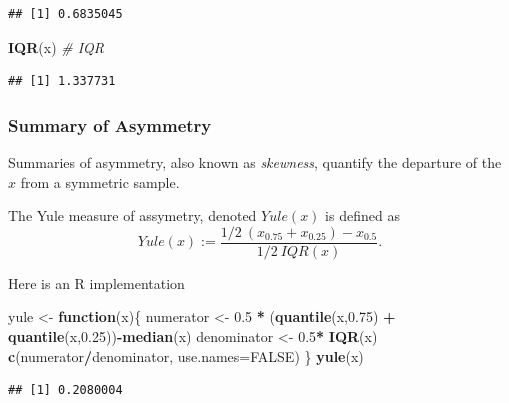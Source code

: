 \documentclass[]{book}
\newenvironment{Shaded}{\begin{snugshade}}{\end{snugshade}}
\newcommand{\CommentTok}[1]{\textcolor[rgb]{0.56,0.35,0.01}{\textit{#1}}}
\newcommand{\ControlFlowTok}[1]{\textcolor[rgb]{0.13,0.29,0.53}{\textbf{#1}}}
\newcommand{\DataTypeTok}[1]{\textcolor[rgb]{0.13,0.29,0.53}{#1}}
\newcommand{\FloatTok}[1]{\textcolor[rgb]{0.00,0.00,0.81}{#1}}
\newcommand{\KeywordTok}[1]{\textcolor[rgb]{0.13,0.29,0.53}{\textbf{#1}}}
\newcommand{\NormalTok}[1]{#1}
\newcommand{\OperatorTok}[1]{\textcolor[rgb]{0.81,0.36,0.00}{\textbf{#1}}}
\newcommand{\OtherTok}[1]{\textcolor[rgb]{0.56,0.35,0.01}{#1}}
\newcommand{\StringTok}[1]{\textcolor[rgb]{0.31,0.60,0.02}{#1}}
\theoremstyle{definition}
\theoremstyle{definition}
\theoremstyle{definition}
\theoremstyle{remark}
\let\BeginKnitrBlock\begin \let\EndKnitrBlock\end
\begin{document}
\begin{verbatim}
## [1] 0.6835045
\end{verbatim}

\begin{Shaded}
\begin{Highlighting}[]
\KeywordTok{IQR}\NormalTok{(x) }\CommentTok{# IQR}
\end{Highlighting}
\end{Shaded}

\begin{verbatim}
## [1] 1.337731
\end{verbatim}

\hypertarget{summary-of-asymmetry}{%
\subsubsection{Summary of Asymmetry}\label{summary-of-asymmetry}}

Summaries of asymmetry, also known as \emph{skewness}, quantify the departure of the \(x\) from a symmetric sample.

\BeginKnitrBlock{definition}[Yule]
\protect\hypertarget{def:unnamed-chunk-122}{}{\label{def:unnamed-chunk-122} {} }The Yule measure of assymetry, denoted \(Yule(x)\) is defined as
\[Yule(x) := \frac{1/2 \: (x_{0.75}+x_{0.25}) - x_{0.5} }{1/2 \: IQR(x)} .\]
\EndKnitrBlock{definition}

Here is an R implementation

\begin{Shaded}
\begin{Highlighting}[]
\NormalTok{yule <-}\StringTok{ }\ControlFlowTok{function}\NormalTok{(x)\{}
\NormalTok{  numerator <-}\StringTok{ }\FloatTok{0.5} \OperatorTok{*}\StringTok{ }\NormalTok{(}\KeywordTok{quantile}\NormalTok{(x,}\FloatTok{0.75}\NormalTok{) }\OperatorTok{+}\StringTok{ }\KeywordTok{quantile}\NormalTok{(x,}\FloatTok{0.25}\NormalTok{))}\OperatorTok{-}\KeywordTok{median}\NormalTok{(x) }
\NormalTok{  denominator <-}\StringTok{ }\FloatTok{0.5}\OperatorTok{*}\StringTok{ }\KeywordTok{IQR}\NormalTok{(x)}
  \KeywordTok{c}\NormalTok{(numerator}\OperatorTok{/}\NormalTok{denominator, }\DataTypeTok{use.names=}\OtherTok{FALSE}\NormalTok{)}
\NormalTok{\}}
\KeywordTok{yule}\NormalTok{(x)}
\end{Highlighting}
\end{Shaded}

\begin{verbatim}
## [1] 0.2080004
\end{verbatim}
\end{document}
